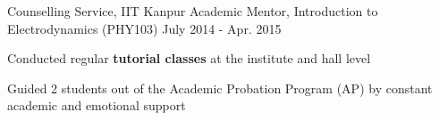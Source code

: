 \begin{cventries}
	\cventry
	{Counselling Service, IIT Kanpur} %
	{Academic Mentor, Introduction to Electrodynamics (PHY103)} %
	{July 2014 - Apr. 2015} %
	{} %
	{
		\begin{cvitems} %
			\item {Conducted regular \textbf{tutorial classes} at the institute and hall level}
			\item {Guided 2 students out of the Academic Probation Program (AP) by constant academic and emotional support }
		\end{cvitems}
	}
\end{cventries}

